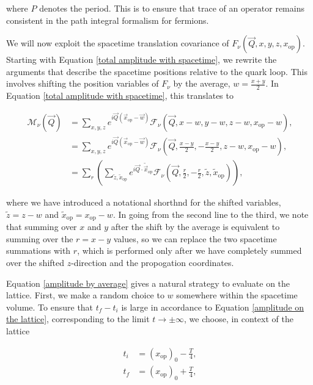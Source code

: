 \documentclass{article}
\numberwithin{equation}{section} %
\begin{document}
\noindent where $P$ denotes the period. This is to ensure that trace of an operator remains consistent in the path integral formalism for fermions\cite{antiperiodic}. 

We will now exploit the spacetime translation covariance of $F_\nu(\vec{Q},x,y,z,x_\mathrm{op})$. Starting with Equation \ref{total amplitude with spacetime}, we rewrite the arguments that describe the spacetime positions relative to the quark loop. This involves shifting the position variables of $F_\nu$ by the average, $w=\frac{x+y}{2}$. In Equation \ref{total amplitude with spacetime}, this translates to

\begin{equation}
\begin{split}
\mathcal{M}_\nu(\vec{Q}) &= \sum_{x,y,z} e^{i\vec{Q}(\vec{x}_\mathrm{op}-\vec{w})} \mathcal{F}_\nu(\vec{Q},x-w,y-w,z-w,x_\mathrm{op}-w), \\
&= \sum_{x,y,z} e^{i\vec{Q}(\vec{x}_\mathrm{op}-\vec{w})} \mathcal{F}_\nu(\vec{Q},\frac{x-y}{2},-\frac{x-y}{2},z-w,x_\mathrm{op}-w),\\
&= \sum_r\left(\sum_{\tilde{z},\tilde{x}_\mathrm{op}} e^{i\vec{Q}\cdot\tilde{\vec{x}}_\mathrm{op}} \mathcal{F}_\nu(\vec{Q},\frac{r}{2},-\frac{r}{2},\tilde{z},\tilde{x}_\mathrm{op})\right),
\end{split}
\label{amplitude by average}
\end{equation}

\noindent where we have introduced a notational shorthnd for the shifted variables, $\tilde{z}=z-w$ and $\tilde{x}_\mathrm{op}=x_\mathrm{op}-w$. In going from the second line to the third, we note that summing over $x$ and $y$ after the shift by the average is equivalent to summing over the $r=x-y$ values, so we can replace the two spacetime summations with $r$, which is performed only after we have completely summed over the shifted $z$-direction and the propogation coordinates.

Equation \ref{amplitude by average} gives a natural strategy to evaluate on the lattice. First, we make a random choice to $w$ somewhere within the spacetime volume. To ensure that $t_f-t_i$ is large in accordance to Equation \ref{amplitude on the lattice}, corresponding to the limit $t\rightarrow \pm \infty$, we choose, in context of the lattice

\begin{equation}
\begin{split}
t_i &= (x_\mathrm{op})_0 -\frac{T}{4},\\
t_f &= (x_\mathrm{op})_0 +\frac{T}{4},
\end{split}
\end{equation}
\end{document}
